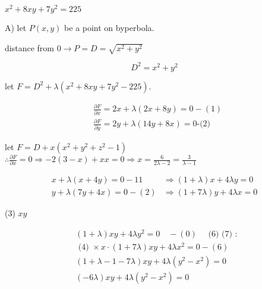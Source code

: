 \documentclass[12pt, a4paper]{article}
\begin{document}
$x^{2}+8 x y+7 y^{2}=225$

A) let $P(x, y)$ be a point on byperbola.

distance from $0 \rightarrow P=D=\sqrt{x^{2}+y^{2}}$

$$
D^{2}=x^{2}+y^{2}
$$

let $F=D^{2}+\lambda\left(x^{2}+8 x y+7 y^{2}-225\right)$.

$$
\begin{aligned}
& \frac{\partial F}{\partial x}=2 x+\lambda(2 x+8 y)=0-(1) \\
& \frac{\partial F}{\partial y}=2 y+\lambda(14 y+8 x)=0 \text {-(2) }
\end{aligned}
$$

let $F=D+x\left(x^{2}+y^{2}+z^{2}-1\right)$
    $\therefore \frac{\partial F}{\partial x}=0 \Rightarrow-2(3-x)+x x=0 \Rightarrow x=\frac{6}{2 \lambda-2}=\frac{3}{\lambda-1}$

$$
\begin{array}{ll}
x+\lambda(x+4 y)=0-11 & \Rightarrow(1+\lambda) x+4 \lambda y=0 \\
y+\lambda(7 y+4 x)=0-(2) & \Rightarrow(1+7 \lambda) y+4 \lambda x=0
\end{array}
$$

(3) $x y$

$$
\begin{aligned}
& (1+\lambda) x y+4 \lambda y^{2}=0 \quad-(0) \quad \text { (6) (7) : } \\
& \text { (4) } \times x \cdot(1+7 \lambda) x y+4 \lambda x^{2}=0-(6) \\
& (1+\lambda-1-7 \lambda) x y+4 \lambda\left(y^{2}-x^{2}\right)=0 \\
& (-6 \lambda) x y+4 \lambda\left(y^{2}-x^{2}\right)=0
\end{aligned}
$$
\end{document}
